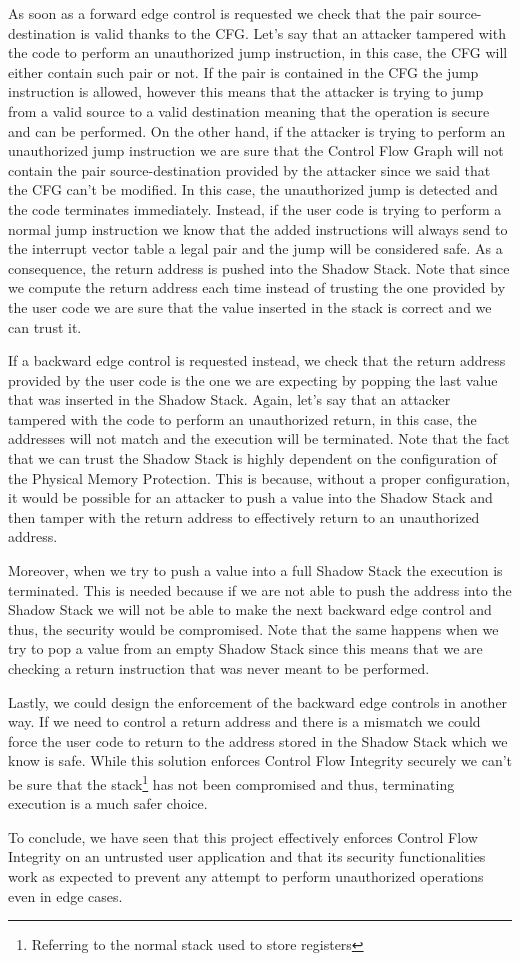 As soon as a forward edge control is requested we check that the pair source-destination
is valid thanks to the CFG. Let's say that an attacker tampered with the code to
perform an unauthorized jump instruction, in this case, the CFG will either contain
such pair or not. If the pair is contained in the CFG the jump instruction is
allowed, however this means that the attacker is trying to jump from a valid source
to a valid destination meaning that the operation is secure and can be performed.
On the other hand, if the attacker is trying to perform an unauthorized jump instruction
we are sure that the Control Flow Graph will not contain the pair source-destination
provided by the attacker since we said that the CFG can't be modified. In this
case, the unauthorized jump is detected and the code terminates immediately.
Instead, if the user code is trying to perform a normal jump instruction we know
that the added instructions will always send to the interrupt vector table a legal
pair and the jump will be considered safe. As a consequence, the return address is
pushed into the Shadow Stack. Note that since we compute the return address each
time instead of trusting the one provided by the user code we are sure that the
value inserted in the stack is correct and we can trust it.

If a backward edge control is requested instead, we check that the return address
provided by the user code is the one we are expecting by popping the last value that
was inserted in the Shadow Stack. Again, let's say that an attacker tampered with
the code to perform an unauthorized return, in this case, the addresses will not
match and the execution will be terminated. Note that the fact that we can trust
the Shadow Stack is highly dependent on the configuration of the Physical Memory
Protection. This is because, without a proper configuration, it would be possible
for an attacker to push a value into the Shadow Stack and then tamper with the return
address to effectively return to an unauthorized address.

Moreover, when we try to push a value into a full Shadow Stack the execution is
terminated. This is needed because if we are not able to push the address into the
Shadow Stack we will not be able to make the next backward edge control and thus,
the security would be compromised. Note that the same happens when we try to pop
a value from an empty Shadow Stack since this means that we are checking a return
instruction that was never meant to be performed.

Lastly, we could design the enforcement of the backward edge controls in another
way. If we need to control a return address and there is a mismatch we could force
the user code to return to the address stored in the Shadow Stack which we know is
safe. While this solution enforces Control Flow Integrity securely we can't be
sure that the stack\footnote{Referring to the normal stack used to store
registers} has not been compromised and thus, terminating execution is a much
safer choice.

To conclude, we have seen that this project effectively enforces Control Flow Integrity
on an untrusted user application and that its security functionalities work as expected
to prevent any attempt to perform unauthorized operations even in edge cases.
